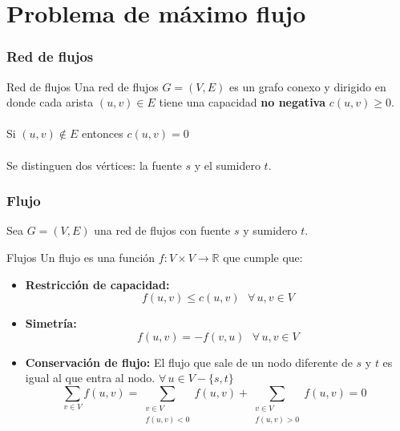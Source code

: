 \documentclass{beamer}
\begin{document}
\section[Max-flow]{Problema de máximo flujo}
	
	\begin{frame}
		\frametitle{Red de flujos}
		\begin{block}{Red de flujos}
			Una red de flujos $G = (V, E)$ es un grafo conexo y dirigido en donde cada arista $(u, v) \in E$ tiene una capacidad \textbf{no negativa} $c(u,v) \geq 0$.\\ \quad \\
			Si $(u, v) \not\in E$ entonces $c(u, v) = 0$ \\ \quad \\
			Se distinguen dos vértices: la fuente $s$ y el sumidero $t$.
		\end{block}
	\end{frame}

	\begin{frame}
		\frametitle{Flujo}
		Sea $G = (V, E)$ una red de flujos con fuente $s$ y sumidero $t$.
		\begin{block}{Flujos}
			Un flujo es una función $f:V \times V \rightarrow \mathbb{R}$ que cumple que:
			\begin{itemize}
				\item \textbf{Restricción de capacidad:}
					$$f(u,v) \leq c(u,v) \,\,\,\, \forall\, u,v \in V$$
				\item \textbf{Simetría:} 
					$$f(u,v) = -f(v,u) \,\,\,\, \forall\, u,v \in V$$
				\item \textbf{Conservación de flujo:} El flujo que sale de un nodo diferente de $s$ y $t$ es igual al que entra al nodo. $\forall\, u \in V - \{s, t\}$ 
					$$\displaystyle\sum_{v \in V}{f(u,v)} = \displaystyle\sum_{\substack{v \in V\\f(u,v) < 0}}{f(u,v)} + \displaystyle\sum_{\substack{v \in V\\f(u,v) > 0}}{f(u,v)} = 0 \,\,\,\, $$
			\end{itemize}
		\end{block}
	\end{frame}
\end{document}
